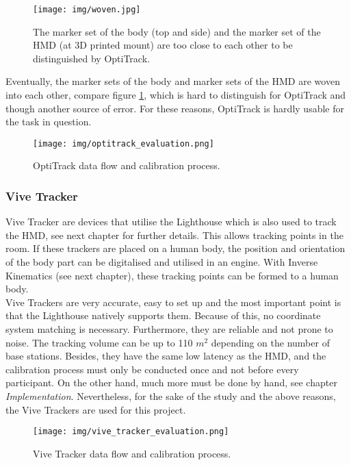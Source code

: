 \begin{figure}
	\centering
	\texttt{[image: img/woven.jpg]}
	\caption{The marker set of the body (top and side) and the marker set of the HMD (at 3D printed mount) are too close to each other to be distinguished by OptiTrack.}
	\label{fig:woven}
\end{figure}
Eventually, the marker sets of the body and marker sets of the HMD are woven into each other, compare figure \ref{fig:woven}, which is hard to distinguish for OptiTrack and though another source of error. For these reasons, OptiTrack is hardly usable for the task in question.
\begin{figure}
	\centering
	\texttt{[image: img/optitrack\_evaluation.png]}
	\caption{OptiTrack data flow and calibration process.}
	\label{fig:optitrack}
\end{figure}

\subsubsection{Vive Tracker}
Vive Tracker are devices that utilise the Lighthouse which is also used to track the HMD, see next chapter for further details. This allows tracking points in the room. If these trackers are placed on a human body, the position and orientation of the body part can be digitalised and utilised in an engine. With Inverse Kinematics (see next chapter), these tracking points can be formed to a human body.\\
Vive Trackers are very accurate, easy to set up and the most important point is that the Lighthouse natively supports them. Because of this, no coordinate system matching is necessary. Furthermore, they are reliable and not prone to noise. The tracking volume can be up to 110 $m^2$ depending on the number of base stations. Besides, they have the same low latency as the HMD, and the calibration process must only be conducted once and not before every participant. On the other hand, much more must be done by hand, see chapter \textit{Implementation}. Nevertheless, for the sake of the study and the above reasons, the Vive Trackers are used for this project.
\begin{figure}
	\centering
	\texttt{[image: img/vive\_tracker\_evaluation.png]}
	\caption{Vive Tracker data flow and calibration process.}
	\label{fig:viveTracker}
\end{figure}

